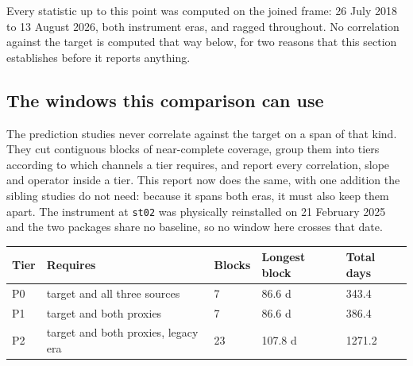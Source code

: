 \documentclass[11pt,a4paper]{article}
\begin{document}
\label{sec:target}

Every statistic up to this point was computed on the joined frame: 26 July 2018
to 13 August 2026, both instrument eras, and ragged throughout. No correlation
against the target is computed that way below, for two reasons that this section
establishes before it reports anything.

\subsection{The windows this comparison can use}
\label{sec:tiers}

The prediction studies never correlate against the target on a span of that
kind. They cut contiguous blocks of near-complete coverage, group them into
tiers according to which channels a tier requires, and report every correlation,
slope and operator inside a tier. This report now does the same, with one
addition the sibling studies do not need: because it spans both eras, it must
also keep them apart. The instrument at \texttt{st02} was physically reinstalled
on 21 February 2025 and the two packages share no baseline, so no window here
crosses that date.

\begin{center}
\small
\begin{tabularx}{\textwidth}{l L{3.4cm} R{1.4cm} R{2.6cm} R{1.9cm}}
\toprule
\textbf{Tier} & \textbf{Requires} & \textbf{Blocks} & \textbf{Longest block} &
\textbf{Total days} \\
\midrule
P0 & target and all three sources & 7 & 86.6 d & 343.4 \\
P1 & target and both proxies     & 7 & 86.6 d & 386.4 \\
P2 & target and both proxies, legacy era & 23 & 107.8 d & 1271.2 \\
\bottomrule
\end{tabularx}
\end{center}

\end{document}

